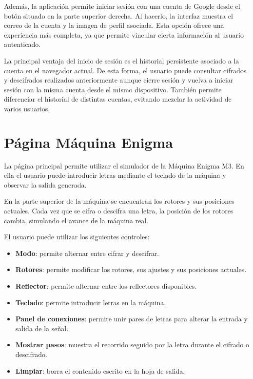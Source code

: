 Además, la aplicación permite iniciar sesión con una cuenta de Google desde el botón situado en la parte superior derecha. Al hacerlo, la interfaz muestra el correo de la cuenta y la imagen de perfil asociada. Esta opción ofrece una experiencia más completa, ya que permite vincular cierta información al usuario autenticado.

La principal ventaja del inicio de sesión es el historial persistente asociado a la cuenta en el navegador actual. De esta forma, el usuario puede consultar cifrados y descifrados realizados anteriormente aunque cierre sesión y vuelva a iniciar sesión con la misma cuenta desde el mismo dispositivo. También permite diferenciar el historial de distintas cuentas, evitando mezclar la actividad de varios usuarios.

\section{Página Máquina Enigma}

La página principal permite utilizar el simulador de la Máquina Enigma M3. En ella el usuario puede introducir letras mediante el teclado de la máquina y observar la salida generada.

En la parte superior de la máquina se encuentran los rotores y sus posiciones actuales. Cada vez que se cifra o descifra una letra, la posición de los rotores cambia, simulando el avance de la máquina real.

El usuario puede utilizar los siguientes controles:

\begin{itemize}
	\item \textbf{Modo}: permite alternar entre cifrar y descifrar.
	\item \textbf{Rotores}: permite modificar los rotores, sus ajustes y sus posiciones actuales.
	\item \textbf{Reflector}: permite alternar entre los reflectores disponibles.
	\item \textbf{Teclado}: permite introducir letras en la máquina.
	\item \textbf{Panel de conexiones}: permite unir pares de letras para alterar la entrada y salida de la señal.
	\item \textbf{Mostrar pasos}: muestra el recorrido seguido por la letra durante el cifrado o descifrado.
	\item \textbf{Limpiar}: borra el contenido escrito en la hoja de salida.
\end{itemize}

